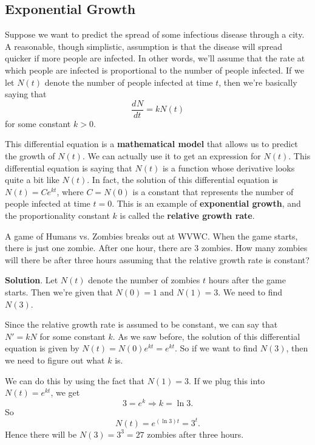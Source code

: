 \documentclass[10pt,]{book}
\newcommand{\terminology}[1]{\textbf{#1}}
\theoremstyle{ptxplainnotitle}
\theoremstyle{ptxplaintitle}
\theoremstyle{ptxplainnotitle}
\theoremstyle{ptxplaintitle}
\theoremstyle{ptxplainnotitle}
\theoremstyle{ptxplaintitle}
\theoremstyle{ptxdefinitionnotitle}
\theoremstyle{ptxdefinitiontitle}
\theoremstyle{ptxdefinitionnotitle}
\theoremstyle{ptxdefinitiontitle}
\theoremstyle{ptxdefinitionnotitle}
\theoremstyle{ptxdefinitiontitle}
\theoremstyle{ptxdefinitionnotitle}
\theoremstyle{ptxdefinitiontitle}
\theoremstyle{ptxdefinitionnotitle}
\theoremstyle{ptxdefinitiontitle}
\numberwithin{equation}{section}
\newcommand{\dv}[3][]{\dfrac{d^{#1} #2}{d #3^{#1}}}
\begin{document}
\subsection[{Exponential Growth}]{Exponential Growth}\label{subsection-exponential-growth}
\hypertarget{p-246}{}%
Suppose we want to predict the spread of some infectious disease through a city. A reasonable, though simplistic, assumption is that the disease will spread quicker if more people are infected. In other words, we'll assume that the rate at which people are infected is proportional to the number of people infected. If we let \(N(t)\) denote the number of people infected at time \(t\), then we're basically saying that%
\begin{equation*}
\dv{N}{t} = kN(t)
\end{equation*}
for some constant \(k > 0\).%
\par
\hypertarget{p-247}{}%
This differential equation is a \terminology{mathematical model} that allows us to predict the growth of \(N(t)\). We can actually use it to get an expression for \(N(t)\). This differential equation is saying that \(N(t)\) is a function whose derivative looks quite a bit like \(N(t)\). In fact, the solution of this differential equation is \(N(t) = Ce^{kt}\), where \(C = N(0)\) is a constant that represents the number of people infected at time \(t=0\). This is an example of \terminology{exponential growth}, and the proportionality constant \(k\) is called the \terminology{relative growth rate}.%
\begin{example}\label{example-modeling-an-outbreak}
\hypertarget{p-248}{}%
A game of Humans vs. Zombies breaks out at WVWC. When the game starts, there is just one zombie. After one hour, there are \(3\) zombies. How many zombies will there be after three hours assuming that the relative growth rate is constant?%
\par\smallskip%
\noindent\textbf{Solution}.\hypertarget{solution-54}{}\quad%
\hypertarget{p-249}{}%
Let \(N(t)\) denote the number of zombies \(t\) hours after the game starts. Then we're given that \(N(0) = 1\) and \(N(1) = 3\). We need to find \(N(3)\).%
\par
\hypertarget{p-250}{}%
Since the relative growth rate is assumed to be constant, we can say that \(N' = kN\) for some constant \(k\). As we saw before, the solution of this differential equation is given by \(N(t) = N(0)e^{kt} = e^{kt}\). So if we want to find \(N(3)\), then we need to figure out what \(k\) is.%
\par
\hypertarget{p-251}{}%
We can do this by using the fact that \(N(1) = 3\). If we plug this into \(N(t) = e^{kt}\), we get%
\begin{equation*}
3 = e^{k} \Rightarrow k = \ln3.
\end{equation*}
So%
\begin{equation*}
N(t) = e^{(\ln 3)t} = 3^{t}.
\end{equation*}
Hence there will be \(N(3) = 3^{3} = 27\) zombies after three hours.%
\end{example}
\typeout{************************************************}
\typeout{************************************************}
\end{document}
